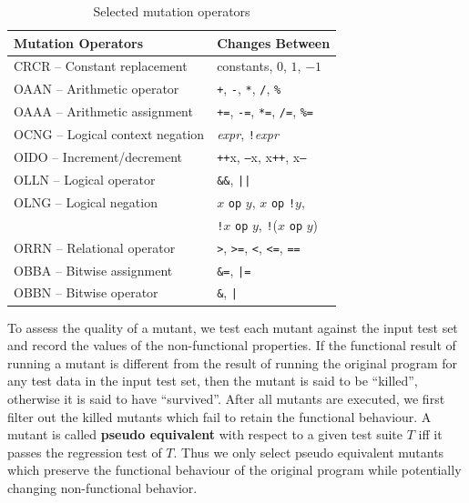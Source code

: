 \begin{table}[t]
\caption{Selected mutation operators}
\label{tab:cmop} 
\begin{center}
\begin{tabular}{ | l | l |}
  \hline
  Mutation Operators & Changes Between \\ 
\hline
 CRCR -- Constant replacement & constants, $0$, $1$, $-1$ \\
 OAAN -- Arithmetic operator & \texttt{+}, \texttt{-}, \texttt{*}, \texttt{/}, \texttt{\%} \\
 OAAA -- Arithmetic assignment & \texttt{+=}, \texttt{-=}, \texttt{*=}, \texttt{/=}, \texttt{\%=} \\
 OCNG -- Logical context negation & \textit{expr}, \texttt{!}\textit{expr} \\
 OIDO -- Increment/decrement & \texttt{++}x, \texttt{--}x, x\texttt{++}, x\texttt{--} \\
  OLLN -- Logical operator & \texttt{\&\&}, \texttt{||} \\ 
  OLNG -- Logical negation & $x$ \texttt{op} $y$, $x$ \texttt{op} \texttt{!}$y$,
  \\
  & \texttt{!}$x$ \texttt{op} $y$, \texttt{!}($x$ \texttt{op} $y$)\\
  ORRN -- Relational operator & \texttt{>}, \texttt{>=}, \texttt{<}, \texttt{<=}, \texttt{==} \\
  OBBA -- Bitwise assignment & \texttt{\&=}, \texttt{|=} \\
  OBBN -- Bitwise operator & \texttt{\&}, \texttt{|} \\
\hline
\end{tabular} 
\end{center} 
\end{table} 

To assess the quality of a mutant, we test each mutant against the input test set and record the values of the non-functional properties. If the functional result of running a mutant is different from the result of running the original program for any test data in the input test set, then the mutant is said to be ``killed'', otherwise it is said to have ``survived''. 
After all mutants are executed, we first filter out the killed mutants
which fail to retain the functional behaviour. A mutant is called
\textbf{pseudo equivalent} with respect to a given test suite $T$ iff it
passes the regression test of $T$.  Thus we only select pseudo equivalent
mutants which preserve the functional behaviour of the original program
while potentially changing non-functional behavior. 

